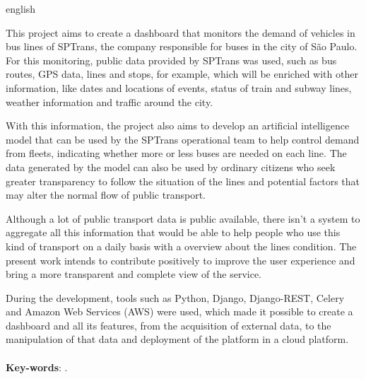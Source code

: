 \begin{resumo}[Abstract]
	\begin{otherlanguage*}{english}
	\indent
	\par This project aims to create a dashboard that monitors the demand of vehicles in bus lines of SPTrans, the company responsible for buses in the city of São Paulo. For this monitoring, public data provided by SPTrans was used, such as bus routes, GPS data, lines and stops, for example, which will be enriched with other information, like dates and locations of events, status of train and subway lines, weather information and traffic around the city.
	\par With this information, the project also aims to develop an artificial intelligence model that can be used by the SPTrans operational team to help control demand from fleets, indicating whether more or less buses are needed on each line. The data generated by the model can also be used by ordinary citizens who seek greater transparency to follow the situation of the lines and potential factors that may alter the normal flow of public transport.
	\par Although a lot of public transport data is public available, there isn’t a system to aggregate all this information that would be able to help people who use this kind of transport on a daily basis with a overview about the lines condition. The present work intends to contribute positively to improve the user experience and bring a more transparent and complete view of the service.
	\par During the development, tools such as Python, Django, Django-REST, Celery and Amazon Web Services (AWS) were used, which made it possible to create a dashboard and all its features, from the acquisition of external data, to the manipulation of that data and deployment of the platform in a cloud platform.
	\\
	\\
	\textbf{Key-words}: \KeyWordA.~
	\end{otherlanguage*}
\end{resumo}
